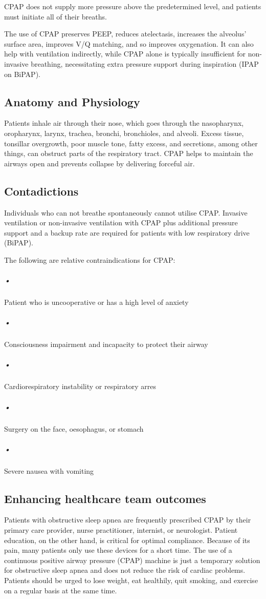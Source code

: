 \documentclass[12pt]{article}
\begin{document}
CPAP does not supply more pressure above the predetermined level, and patients must initiate all of their breaths.

The use of CPAP preserves PEEP, reduces atelectasis, increases the alveolus' surface area, improves V/Q matching, and so improves oxygenation. It can also help with ventilation indirectly, while CPAP alone is typically insufficient for non-invasive breathing, necessitating extra pressure support during inspiration (IPAP on BiPAP).

\subsection{Anatomy and Physiology}

Patients inhale air through their nose, which goes through the nasopharynx, oropharynx, larynx, trachea, bronchi, bronchioles, and alveoli. Excess tissue, tonsillar overgrowth, poor muscle tone, fatty excess, and secretions, among other things, can obstruct parts of the respiratory tract. CPAP helps to maintain the airways open and prevents collapse by delivering forceful air.

\subsection{Contadictions}

Individuals who can not breathe spontaneously cannot utilise CPAP. Invasive ventilation or non-invasive ventilation with CPAP plus additional pressure support and a backup rate are required for patients with low respiratory drive (BiPAP).


The following are relative contraindications for CPAP:

\subparagraph{•}
Patient who is uncooperative or has a high level of anxiety

\subparagraph{•}
Consciousness impairment and incapacity to protect their airway

\subparagraph{•}
Cardiorespiratory instability or respiratory arres

\subparagraph{•}
Surgery on the face, oesophagus, or stomach

\subparagraph{•}
Severe nausea with vomiting

\subsection{Enhancing healthcare team outcomes}

Patients with obstructive sleep apnea are frequently prescribed CPAP by their primary care provider, nurse practitioner, internist, or neurologist. Patient education, on the other hand, is critical for optimal compliance. Because of its pain, many patients only use these devices for a short time. The use of a continuous positive airway pressure (CPAP) machine is just a temporary solution for obstructive sleep apnea and does not reduce the risk of cardiac problems. Patients should be urged to lose weight, eat healthily, quit smoking, and exercise on a regular basis at the same time.
\end{document}
